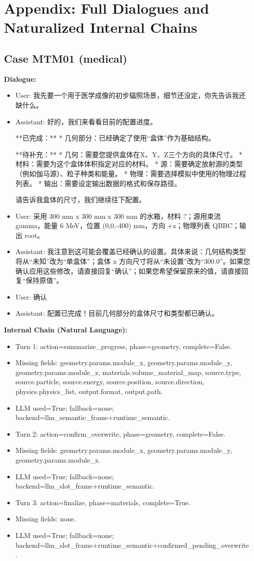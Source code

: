 \documentclass[11pt]{ctexart}
\begin{document}
\section{Appendix: Full Dialogues and Naturalized Internal Chains}
\subsection{Case MTM01 (medical)}
\textbf{Dialogue:}
\begin{itemize}
\item User: 我先要一个用于医学成像的初步辐照场景，细节还没定，你先告诉我还缺什么。
\item Assistant: 好的，我们来看看目前的配置进度。

**已完成：**
*   几何部分：已经确定了使用“盒体”作为基础结构。

**待补充：**
*   几何：需要您提供盒体在X、Y、Z三个方向的具体尺寸。
*   材料：需要为这个盒体体积指定对应的材料。
*   源：需要确定放射源的类型（例如伽马源）、粒子种类和能量。
*   物理：需要选择模拟中使用的物理过程列表。
*   输出：需要设定输出数据的格式和保存路径。

请告诉我盒体的尺寸，我们继续往下配置。
\item User: 采用 300 mm x 300 mm x 300 mm 的水箱，材料 ?；源用束流 gamma，能量 6 MeV，位置 (0,0,-400) mm，方向 +z；物理列表 QBBC；输出 root。
\item Assistant: 我注意到这可能会覆盖已经确认的设置。具体来说：几何结构类型将从“未知”改为“单盒体”；盒体 x 方向尺寸将从“未设置”改为“300.0”。如果您确认应用这些修改，请直接回复“确认”；如果您希望保留原来的值，请直接回复“保持原值”。
\item User: 确认
\item Assistant: 配置已完成！目前几何部分的盒体尺寸和类型都已确认。
\end{itemize}
\textbf{Internal Chain (Natural Language):}
\begin{itemize}
\item Turn 1: action=summarize\_progress, phase=geometry, complete=False.
\item Missing fields: geometry.params.module\_x, geometry.params.module\_y, geometry.params.module\_z, materials.volume\_material\_map, source.type, source.particle, source.energy, source.position, source.direction, physics.physics\_list, output.format, output.path.
\item LLM used=True; fallback=none; backend=llm\_semantic\_frame+runtime\_semantic.
\item Turn 2: action=confirm\_overwrite, phase=geometry, complete=False.
\item Missing fields: geometry.params.module\_x, geometry.params.module\_y, geometry.params.module\_z.
\item LLM used=True; fallback=none; backend=llm\_slot\_frame+runtime\_semantic.
\item Turn 3: action=finalize, phase=materials, complete=True.
\item Missing fields: none.
\item LLM used=True; fallback=none; backend=llm\_slot\_frame+runtime\_semantic+confirmed\_pending\_overwrite.
\end{itemize}
\end{document}
